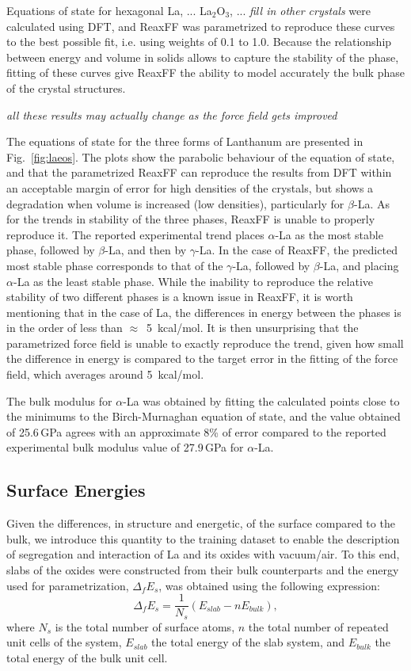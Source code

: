 \documentclass[journal=jpcafh,manuscript=article]{achemso}
\begin{document}
Equations of state for hexagonal La, ... La$_2$O$_3$, ... \emph{fill in other crystals} were calculated using DFT, and ReaxFF was parametrized to reproduce these curves to the best possible fit, i.e. using weights of 0.1 to 1.0.
Because the relationship between energy and volume in solids allows to capture the stability of the phase, fitting of these curves give ReaxFF the ability to model accurately the bulk phase of the crystal structures.

\emph{all these results may actually change as the force field gets improved}

The equations of state for the three forms of Lanthanum are presented in Fig.~\ref{fig:laeos}.
The plots show the parabolic behaviour of the equation of state, and that the parametrized ReaxFF can reproduce the results from DFT within an acceptable margin of error for high densities of the crystals, but shows a degradation when volume is increased (low densities), particularly for $\beta$-La.
As for the trends in stability of the three phases, ReaxFF is unable to properly reproduce it.
The reported experimental trend places $\alpha$-La as the most stable phase, followed by $\beta$-La, and then by $\gamma$-La.
In the case of ReaxFF, the predicted most stable phase corresponds to that of the $\gamma$-La, followed by $\beta$-La, and placing $\alpha$-La as the least stable phase.
While the inability to reproduce the relative stability of two different phases is a known issue in ReaxFF, it is worth mentioning that in the case of La, the differences in energy between the phases is in the order of less than $\approx$~5~kcal/mol.
It is then unsurprising that the parametrized force field is unable to exactly reproduce the trend,  given how small the difference in energy is compared to the target error in the fitting of the force field, which averages around 5~kcal/mol.

The bulk modulus for $\alpha$-La was obtained by fitting the calculated points close to the minimums to the Birch-Murnaghan equation of state\cite{fu_first-principles_1983}, and the value obtained of 25.6\,GPa agrees with an approximate 8\% of error compared to the reported experimental bulk modulus value of 27.9\,GPa for $\alpha$-La.\cite{lide2003crc}

\subsection{Surface Energies}

Given the differences, in structure and energetic, of the surface compared to the bulk, we introduce this quantity to the training dataset to enable the description of segregation and interaction of La and its oxides with vacuum/air.
To this end, slabs of the oxides were constructed from their bulk counterparts and the energy used for parametrization, $\Delta_f E_s$, was obtained using the following expression:
\begin{equation}
    \Delta_f E_s = \frac{1}{N_s}(E_{slab} - nE_{bulk}),
\end{equation}
where $N_s$ is the total number of surface atoms, $n$ the total number of repeated unit cells of the system, $E_{slab}$ the total energy of the slab system, and $E_{bulk}$ the total energy of the bulk unit cell.
\end{document}
